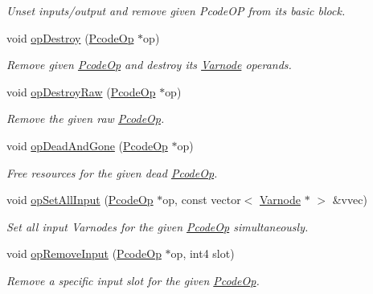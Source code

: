 \begin{DoxyCompactItemize}
\begin{DoxyCompactList}\small\item\em Unset inputs/output and remove given Pcode\+OP from its basic block. \end{DoxyCompactList}\item 
void \mbox{\hyperlink{class_funcdata_a6976625d7b40efca0bc9941cb199ee44}{op\+Destroy}} (\mbox{\hyperlink{class_pcode_op}{Pcode\+Op}} $\ast$op)
\begin{DoxyCompactList}\small\item\em Remove given \mbox{\hyperlink{class_pcode_op}{Pcode\+Op}} and destroy its \mbox{\hyperlink{class_varnode}{Varnode}} operands. \end{DoxyCompactList}\item 
void \mbox{\hyperlink{class_funcdata_aeef2a6be0e9c641f72bf4e87020ddf37}{op\+Destroy\+Raw}} (\mbox{\hyperlink{class_pcode_op}{Pcode\+Op}} $\ast$op)
\begin{DoxyCompactList}\small\item\em Remove the given {\itshape raw} \mbox{\hyperlink{class_pcode_op}{Pcode\+Op}}. \end{DoxyCompactList}\item 
void \mbox{\hyperlink{class_funcdata_aa062c200c86923b0f1032d4ab563e716}{op\+Dead\+And\+Gone}} (\mbox{\hyperlink{class_pcode_op}{Pcode\+Op}} $\ast$op)
\begin{DoxyCompactList}\small\item\em Free resources for the given {\itshape dead} \mbox{\hyperlink{class_pcode_op}{Pcode\+Op}}. \end{DoxyCompactList}\item 
void \mbox{\hyperlink{class_funcdata_adcad3bfd56955103a031fa6d0e78acec}{op\+Set\+All\+Input}} (\mbox{\hyperlink{class_pcode_op}{Pcode\+Op}} $\ast$op, const vector$<$ \mbox{\hyperlink{class_varnode}{Varnode}} $\ast$ $>$ \&vvec)
\begin{DoxyCompactList}\small\item\em Set all input Varnodes for the given \mbox{\hyperlink{class_pcode_op}{Pcode\+Op}} simultaneously. \end{DoxyCompactList}\item 
void \mbox{\hyperlink{class_funcdata_a84937c2241ea5679280223cc0ec8b202}{op\+Remove\+Input}} (\mbox{\hyperlink{class_pcode_op}{Pcode\+Op}} $\ast$op, int4 slot)
\begin{DoxyCompactList}\small\item\em Remove a specific input slot for the given \mbox{\hyperlink{class_pcode_op}{Pcode\+Op}}. \end{DoxyCompactList}\item 

\end{DoxyCompactItemize}
